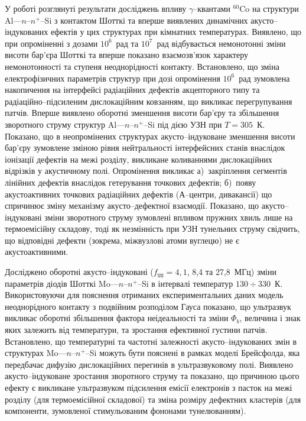 У  роботі розглянуті результати досліджень
впливу $\gamma$--квантами $^{60}$Co на структури Al---$n$--$n^+$--Si з контактом Шотткі та
вперше виявлених динамічних акусто--індукованих ефектів у цих структурах при кімнатних температурах.
Виявлено, що при
опроміненні  з дозами $10^6$~рад та $10^7$~рад відбувається
немонотонні зміни висоти бар'єра Шотткі та вперше показано взаємозв'язок характеру немонотонності та ступеня неоднорідності контакту.
Встановлено, що зміна електрофізичних параметрів структур при дозі опромінення $10^6$~рад
зумовлена накопичення на інтерфейсі радіаційних дефектів акцепторного типу та радіаційно--підсиленим дислокаційним ковзанням, що викликає перегрупування патчів.
Вперше виявлено оборотні зменшення висоти бар'єру та збільшення зворотного струму  структур Al---$n$--$n^+$--Si під дією УЗН при $T=305$~К.
Показано, що в неопромінених структурах акусто--індуковане зменшення висоти бар'єру зумовлене зміною рівня нейтральності інтерфейсних станів
внаслідок іонізації дефектів на межі розділу, викликане коливаннями дислокаційних відрізків у акустичному полі.
Опромінення викликає
а)~закріплення сегментів лінійних дефектів внаслідок гетерування точкових дефектів;
б)~появу акустоактивних точкових радіаційних дефектів (А--центри, дивакансії)
що спричинює зміну механізму акусто--дефектної взаємодії.
Показано, що акусто--індуковані зміни зворотного струму зумовлені впливом пружних хвиль лише на термоемісійну складову,
тоді як незмінність при УЗН тунельних струму свідчить, що відповідні дефекти (зокрема, міжвузлові атоми вуглецю) не є акустоактивними.


Досліджено оборотні акусто--індуковані ($f_\mathtt{US}=4,1$, 8,4 та 27,8~МГц) зміни параметрів діодів Шотткі Mo---$n$--$n^+$--Si в інтервалі температур $130\div330$~К.
Використовуючи для пояснення отриманих експериментальних даних модель неоднорідного контакту з подвійним розподілом Гауса
показано, що ультразвук викликає оборотні збільшення фактора неідеальності та зміни $\Phi_{b}$,
величина і знак яких залежить від температури,
та зростання ефективної густини патчів.
Встановлено, що температурні та частотні залежності акусто--індукованих змін в структурах
 Mo---$n$--$n^+$--Si  можуть бути пояснені в рамках моделі Брейсфолда,
яка передбачає дифузію дислокаційних перегинів в ультразвуковому полі.
Виявлено акусто--індуковане зростання зворотного струму та показано, що причиною цього ефекту є викликане ультразвуком підсилення емісії електронів з пасток на межі розділу (для термоемісійної складової) та зміна розміру дефектних кластерів (для компоненти, зумовленої стимульованим фононами тунелюванням).

